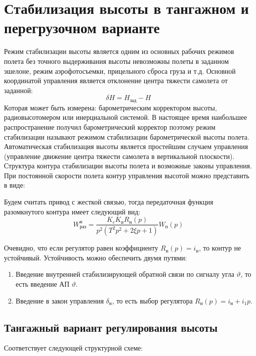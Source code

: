 \documentclass{article}
\begin{document}
\section{Стабилизация высоты в тангажном и перегрузочном варианте}
Режим стабилизации высоты является одним из основных рабочих режимов полета без
точного выдерживания высоты невозможны полеты в заданном эшелоне, режим
аэрофотосъемки, прицельного сброса груза и т.д. Основной координатой управления
является отклонение центра тяжести самолета от заданной:
\[
	\delta H = H_\text{зад} - H
\]
Которая может быть измерена: барометрическим корректором высоты,
радиовысотомером или инерциальной системой. В настоящее время наибольшее
распространение получил барометрический корректор поэтому режим стабилизации
называют режимом стабилизации барометрической высоты полета. Автоматическая
стабилизация высоты является простейшим случаем управления (управление движение
центра тяжести самолета в вертикальной плоскости). Структура контура
стабилизации высоты полета и возможные законы управления. При постоянной
скорости полета контур управления высотой можно представить в виде:

\begin{figure}[H]
	\centering
	\label{fig:fig_50}
\end{figure}

Будем считать привод с жесткой связью, тогда передаточная функция разомкнутого
контура имеет следующий вид:
\[
	W_\text{раз}^\text{н} =\frac{K_c K_\text{н} R_\text{н}(p)}{p^2(T^2 p^2 + 2
		\xi p + 1)}W_\text{п}(p)
\]

Очевидно, что если регулятор равен коэффициенту $R_\text{н}(p)  = i_\text{н}$,
то контур не устойчивый.
Устойчивость можно обеспечить двумя путями:

\begin{enumerate}
	\item Введение внутренней стабилизирующей обратной связи по сигналу угла
	      $\vartheta$, то есть введение АП $\vartheta$.
	\item Введение в закон управления $\delta_\text{н}$, то есть выбор
	      регулятора $R_\text{н}(p) = i_\text{н} + i_1p$.
\end{enumerate}

\subsection{Тангажный вариант регулирования высоты}
Соответствует следующей структурной схеме:
\end{document}
